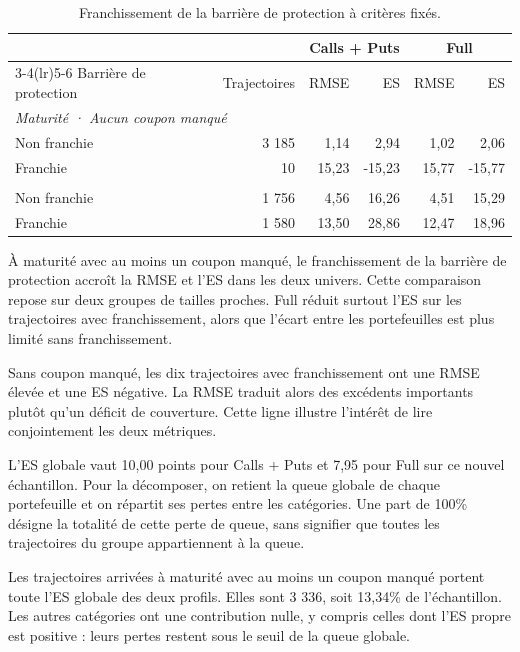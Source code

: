 \documentclass[12pt,a4paper]{article}
\newcommand{\1}{\mathbf{1}}
\begin{document}
\begin{table}[H]
\centering
\small
\setlength{\tabcolsep}{4pt}
\begin{tabular}{lrrrrr}
\toprule
 & & \multicolumn{2}{c}{Calls + Puts} & \multicolumn{2}{c}{Full} \\
\cmidrule(lr){3-4}\cmidrule(lr){5-6}
Barrière de protection & Trajectoires & RMSE & ES & RMSE & ES \\
\midrule
\multicolumn{6}{l}{\textit{Maturité · Aucun coupon manqué}} \\
\addlinespace[2pt]
Non franchie & 3 185 & 1,14 & 2,94 & 1,02 & 2,06 \\
Franchie & 10 & 15,23 & -15,23 & 15,77 & -15,77 \\
\addlinespace[4pt]
\multicolumn{6}{l}{\textit{Maturité · Coupon manqué}} \\
\addlinespace[2pt]
Non franchie & 1 756 & 4,56 & 16,26 & 4,51 & 15,29 \\
Franchie & 1 580 & 13,50 & 28,86 & 12,47 & 18,96 \\
\bottomrule
\end{tabular}

\caption{Franchissement de la barrière de protection à critères fixés.}
\label{tab:tail-barrier-comparison}
\end{table}

À maturité avec au moins un coupon manqué, le franchissement de la barrière de protection accroît la RMSE et l’ES dans les deux univers. Cette comparaison repose sur deux groupes de tailles proches. Full réduit surtout l’ES sur les trajectoires avec franchissement, alors que l’écart entre les portefeuilles est plus limité sans franchissement.

Sans coupon manqué, les dix trajectoires avec franchissement ont une RMSE élevée et une ES négative. La RMSE traduit alors des excédents importants plutôt qu’un déficit de couverture. Cette ligne illustre l’intérêt de lire conjointement les deux métriques.

L’ES globale vaut 10,00 points pour Calls + Puts et 7,95 pour Full sur ce nouvel échantillon. Pour la décomposer, on retient la queue globale de chaque portefeuille et on répartit ses pertes entre les catégories. Une part de 100\% désigne la totalité de cette perte de queue, sans signifier que toutes les trajectoires du groupe appartiennent à la queue.

Les trajectoires arrivées à maturité avec au moins un coupon manqué portent toute l’ES globale des deux profils. Elles sont 3 336, soit 13,34\% de l’échantillon. Les autres catégories ont une contribution nulle, y compris celles dont l’ES propre est positive : leurs pertes restent sous le seuil de la queue globale.
\end{document}
